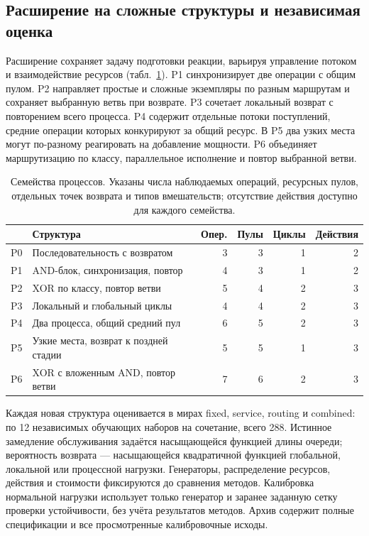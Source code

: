 \subsection{Расширение на сложные структуры и независимая оценка}
Расширение сохраняет задачу подготовки реакции, варьируя управление потоком и взаимодействие ресурсов (табл.~\ref{tab:processes}). P1 синхронизирует две операции с общим пулом. P2 направляет простые и сложные экземпляры по разным маршрутам и сохраняет выбранную ветвь при возврате. P3 сочетает локальный возврат с повторением всего процесса. P4 содержит отдельные потоки поступлений, средние операции которых конкурируют за общий ресурс. В P5 два узких места могут по-разному реагировать на добавление мощности. P6 объединяет маршрутизацию по классу, параллельное исполнение и повтор выбранной ветви.

\begin{table}[t]\caption{Семейства процессов. Указаны числа наблюдаемых операций, ресурсных пулов, отдельных точек возврата и типов вмешательств; отсутствие действия доступно для каждого семейства.}\label{tab:processes}\centering\small\setlength{\tabcolsep}{4pt}
\begin{tabular}{lp{}rrrr}\toprule
 & Структура & Опер. & Пулы & Циклы & Действия\\\midrule
P0 & Последовательность с возвратом & 3 & 3 & 1 & 2\\
P1 & AND-блок, синхронизация, повтор & 4 & 3 & 1 & 2\\
P2 & XOR по классу, повтор ветви & 5 & 4 & 2 & 3\\
P3 & Локальный и глобальный циклы & 4 & 4 & 2 & 3\\
P4 & Два процесса, общий средний пул & 6 & 5 & 2 & 3\\
P5 & Узкие места, возврат к поздней стадии & 5 & 5 & 1 & 3\\
P6 & XOR с вложенным AND, повтор ветви & 7 & 6 & 2 & 3\\
\bottomrule\end{tabular}\end{table}

Каждая новая структура оценивается в мирах fixed, service, routing и combined: по 12 независимых обучающих наборов на сочетание, всего 288. Истинное замедление обслуживания задаётся насыщающейся функцией длины очереди; вероятность возврата — насыщающейся квадратичной функцией глобальной, локальной или процессной нагрузки. Генераторы, распределение ресурсов, действия и стоимости фиксируются до сравнения методов. Калибровка нормальной нагрузки использует только генератор и заранее заданную сетку проверки устойчивости, без учёта результатов методов. Архив содержит полные спецификации и все просмотренные калибровочные исходы.

